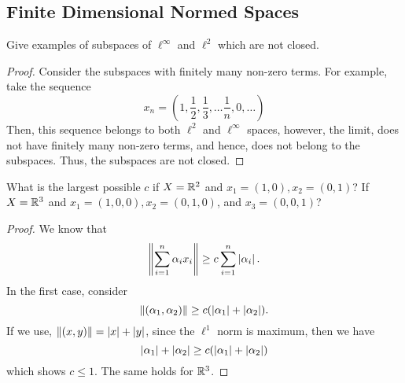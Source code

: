 \subsection{Finite Dimensional Normed Spaces}

\begin{question}
    Give examples of subspaces of $\ell^\infty$ and $\ell^2$ which are not closed.
    \label{section2.4-1}
\end{question}
\begin{proof}
    Consider the subspaces with finitely many non-zero terms. For example, take the sequence 
    \[x_n = \left(1 , \frac{1}{2} , \frac{1}{3} , \ldots \frac{1}{n} , 0 , \ldots  \right)\]
    Then, this sequence belongs to both $\ell^2$ and $\ell^ \infty$ spaces, however, the limit, does not have finitely many non-zero terms, and hence, does not belong to the subspaces. Thus, the subspaces are not closed.
\end{proof}

\begin{question}
    What is the largest possible $c$ if $X = \mathbb{R}^2$ and $x_1 = (1,0), x_2 = (0,1)$? If $X = \mathbb{R}^3$ and $x_1=(1,0,0), x_2=(0,1,0)$, and $x_3 = (0,0,1)$?
    \label{section2.4-2}
\end{question}
\begin{proof}
    We know that
    \[\left\lVert \sum_{i=1}^n \alpha_i x_i  \right\rVert \geq c \sum_{i=1}^n \left\lvert \alpha_i \right\rvert.\]
    In the first case, consider
    \[\left\lVert (\alpha_1 , \alpha_2) \right\rVert \geq c (\left\lvert \alpha_1 \right\rvert + \left\lvert \alpha_2 \right\rvert).\]
    If we use, $\left\lVert (x,y) \right\rVert = \left\lvert x \right\rvert + \left\lvert y \right\rvert$, since the $\ell^1$ norm is maximum, then we have
    \[\left\lvert \alpha_1 \right\rvert + \left\lvert \alpha_2 \right\rvert \geq c (\left\lvert \alpha_1 \right\rvert + \left\lvert \alpha_2 \right\rvert)\]
    which shows $c \leq 1.$ The same holds for $\mathbb{R}^3$.
\end{proof}

